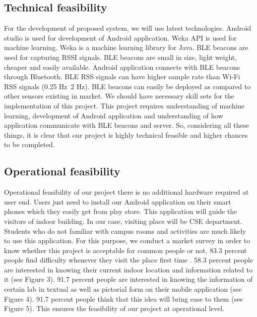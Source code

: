 \documentclass{article}
\begin{document}
\subsection{Technical feasibility}
For the development of proposed system, we will use latest technologies. Android studio is used for development of Android application. Weka API is used for machine learning. Weka is a machine learning library for Java. BLE beacons are used for capturing RSSI signals. BLE beacons are small in size, light weight, cheaper and easily available. Android application\cite{Localization} connects with BLE beacons through Bluetooth. BLE RSS signals can have higher sample rate than Wi-Fi RSS signals (0.25 Hz~2 Hz). BLE beacons can easily be deployed as compared to other sensors existing in market. We should have necessary skill sets for the implementation of this project. This project requires understanding of machine learning, development of Android application and understanding of how application communicate with BLE beacons and server. So, considering all these things, it is clear that our project is highly technical feasible and higher chances to be completed.
\subsection{Operational feasibility}
Operational feasibility of our project there is no additional hardware required at user end. Users just need to install our Android application on their smart phones which they easily get from play store. This application will guide the visitors of indoor building. In our case, visiting place will be CSE department. Students who do not familiar with campus rooms and activities are much likely to use this application. For this purpose, we conduct a market survey in order to know whether this project is acceptable for common people or not, 83.3 percent people find difficulty whenever they visit the place first time . 58.3 percent people are interested in knowing their current indoor location and information related to it (see Figure 3). 91.7 percent people are interested in knowing the information of certain lab in textual as well as pictorial form on their mobile application (see Figure 4). 91.7 percent people think that this idea will bring ease to them (see Figure 5). This ensures the feasibility of our project at operational level.
\\
\\
\end{document}
